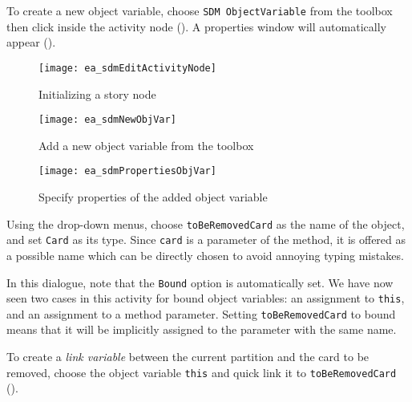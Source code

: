 \begin{stepbystep}
\item To create a new object variable, choose \texttt{SDM ObjectVariable} from the toolbox then click inside the activity node
(). A properties window will automatically appear ().

\begin{figure}[htpb]
\begin{center} 
  \texttt{[image: ea\_sdmEditActivityNode]}
  \caption{Initializing a story node}  
  \label{ea:story_pattern}
\end{center}
\end{figure}

\begin{figure}[htp]
\begin{center}
  \texttt{[image: ea\_sdmNewObjVar]}
  \caption{Add a new object variable from the toolbox}  
  \label{ea:tool_box}
\end{center}
\end{figure}

\newpage

\vspace{0.5cm}

\begin{figure}[htp]
\begin{center}
  \texttt{[image: ea\_sdmPropertiesObjVar]}
  \caption{Specify properties of the added object variable}  
  \label{ea:object_variable_properties}
\end{center}
\end{figure}


\item Using the drop-down menus, choose \texttt{toBeRemovedCard} as the name of the object, and set \texttt{Card} as its type.
Since \texttt{card} is a parameter of the method, it is offered as a possible name which can be directly chosen to avoid annoying typing mistakes.

\item In this dialogue, note that the \texttt{Bound} option is automatically set. We have now seen two cases in this activity for bound
object variables: an assignment to \texttt{this}, and an assignment to a method parameter. Setting \texttt{toBeRemovedCard} to bound means that it will be implicitly
assigned to the parameter with the same name.

\item To create a \emph{link variable} between the current partition and the card to be removed, choose the object variable \texttt{this}
and quick link it to \texttt{toBeRemovedCard} ().


\end{stepbystep}
